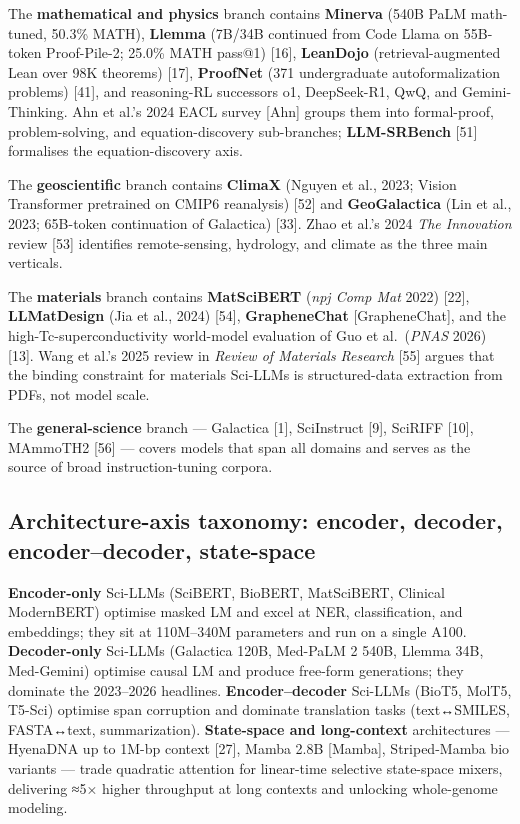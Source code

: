 The \textbf{mathematical and physics} branch contains \textbf{Minerva} (540B PaLM math-tuned, 50.3\% MATH), \textbf{Llemma} (7B/34B continued from Code Llama on 55B-token Proof-Pile-2; 25.0\% MATH pass@1) {[}16{]}, \textbf{LeanDojo} (retrieval-augmented Lean over 98K theorems) {[}17{]}, \textbf{ProofNet} (371 undergraduate autoformalization problems) {[}41{]}, and reasoning-RL successors o1, DeepSeek-R1, QwQ, and Gemini-Thinking. Ahn et al.'s 2024 EACL survey {[}Ahn{]} groups them into formal-proof, problem-solving, and equation-discovery sub-branches; \textbf{LLM-SRBench} {[}51{]} formalises the equation-discovery axis.

The \textbf{geoscientific} branch contains \textbf{ClimaX} (Nguyen et al., 2023; Vision Transformer pretrained on CMIP6 reanalysis) {[}52{]} and \textbf{GeoGalactica} (Lin et al., 2023; 65B-token continuation of Galactica) {[}33{]}. Zhao et al.'s 2024 \emph{The Innovation} review {[}53{]} identifies remote-sensing, hydrology, and climate as the three main verticals.

The \textbf{materials} branch contains \textbf{MatSciBERT} (\emph{npj Comp Mat} 2022) {[}22{]}, \textbf{LLMatDesign} (Jia et al., 2024) {[}54{]}, \textbf{GrapheneChat} {[}GrapheneChat{]}, and the high-Tc-superconductivity world-model evaluation of Guo et al.~(\emph{PNAS} 2026) {[}13{]}. Wang et al.'s 2025 review in \emph{Review of Materials Research} {[}55{]} argues that the binding constraint for materials Sci-LLMs is structured-data extraction from PDFs, not model scale.

The \textbf{general-science} branch --- Galactica {[}1{]}, SciInstruct {[}9{]}, SciRIFF {[}10{]}, MAmmoTH2 {[}56{]} --- covers models that span all domains and serves as the source of broad instruction-tuning corpora.

\subsection{Architecture-axis taxonomy: encoder, decoder, encoder--decoder, state-space}\label{architecture-axis-taxonomy-encoder-decoder-encoderdecoder-state-space}

\textbf{Encoder-only} Sci-LLMs (SciBERT, BioBERT, MatSciBERT, Clinical ModernBERT) optimise masked LM and excel at NER, classification, and embeddings; they sit at 110M--340M parameters and run on a single A100. \textbf{Decoder-only} Sci-LLMs (Galactica 120B, Med-PaLM 2 540B, Llemma 34B, Med-Gemini) optimise causal LM and produce free-form generations; they dominate the 2023--2026 headlines. \textbf{Encoder--decoder} Sci-LLMs (BioT5, MolT5, T5-Sci) optimise span corruption and dominate translation tasks (text↔SMILES, FASTA↔text, summarization). \textbf{State-space and long-context} architectures --- HyenaDNA up to 1M-bp context {[}27{]}, Mamba 2.8B {[}Mamba{]}, Striped-Mamba bio variants --- trade quadratic attention for linear-time selective state-space mixers, delivering ≈5× higher throughput at long contexts and unlocking whole-genome modeling.

